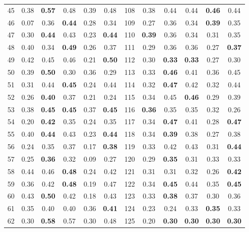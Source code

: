 \documentclass{article}
\begin{document}
{\begin{longtable}{cccccc@{\qquad}cccccc}
45 & 0.38 & \textbf{0.57} & 0.48 & 0.39 & 0.48 & 108 & 0.38 & 0.44 & 0.44 & \textbf{0.46} & 0.44 \\
46 & 0.07 & 0.36 & \textbf{0.44} & 0.28 & 0.34 & 109 & 0.27 & 0.36 & 0.34 & \textbf{0.39} & 0.35 \\
47 & 0.30 & \textbf{0.44} & 0.43 & 0.23 & \textbf{0.44} & 110 & \textbf{0.39} & 0.36 & 0.34 & 0.31 & 0.35 \\
48 & 0.40 & 0.34 & \textbf{0.49} & 0.26 & 0.37 & 111 & 0.29 & 0.36 & 0.36 & 0.27 & \textbf{0.37} \\
49 & 0.42 & 0.45 & 0.46 & 0.21 & \textbf{0.50} & 112 & 0.30 & \textbf{0.33} & \textbf{0.33} & 0.27 & 0.30 \\
50 & 0.39 & \textbf{0.50} & 0.30 & 0.36 & 0.29 & 113 & 0.33 & \textbf{0.46} & 0.41 & 0.36 & 0.45 \\
51 & 0.31 & 0.44 & \textbf{0.45} & 0.24 & 0.44 & 114 & 0.32 & \textbf{0.47} & 0.42 & 0.32 & 0.44 \\
52 & 0.26 & \textbf{0.40} & 0.37 & 0.21 & 0.24 & 115 & 0.34 & 0.45 & \textbf{0.46} & 0.29 & 0.39 \\
53 & 0.38 & \textbf{0.45} & \textbf{0.45} & 0.37 & \textbf{0.45} & 116 & \textbf{0.36} & 0.35 & 0.35 & 0.32 & 0.26 \\
54 & 0.20 & \textbf{0.42} & 0.35 & 0.24 & 0.35 & 117 & 0.34 & \textbf{0.47} & 0.41 & 0.28 & \textbf{0.47} \\
55 & 0.40 & \textbf{0.44} & 0.43 & 0.23 & \textbf{0.44} & 118 & 0.34 & \textbf{0.39} & 0.38 & 0.27 & 0.38 \\
56 & 0.24 & 0.35 & 0.37 & 0.17 & \textbf{0.38} & 119 & 0.33 & 0.42 & 0.43 & 0.31 & \textbf{0.44} \\
57 & 0.25 & \textbf{0.36} & 0.32 & 0.09 & 0.27 & 120 & 0.29 & \textbf{0.35} & 0.31 & 0.33 & 0.33 \\
58 & 0.44 & 0.46 & \textbf{0.48} & 0.24 & 0.42 & 121 & 0.31 & 0.31 & 0.32 & 0.26 & \textbf{0.42} \\
59 & 0.36 & 0.42 & \textbf{0.48} & 0.19 & 0.47 & 122 & 0.34 & \textbf{0.45} & 0.44 & 0.35 & \textbf{0.45} \\
60 & 0.43 & \textbf{0.50} & 0.42 & 0.18 & 0.43 & 123 & 0.33 & \textbf{0.38} & 0.37 & 0.30 & 0.36 \\
61 & 0.35 & 0.40 & 0.40 & 0.36 & \textbf{0.41} & 124 & 0.23 & 0.24 & 0.33 & \textbf{0.35} & 0.33 \\
62 & 0.30 & \textbf{0.58} & 0.57 & 0.30 & 0.48 & 125 & 0.20 & \textbf{0.30} & \textbf{0.30} & \textbf{0.30} & \textbf{0.30} \\

\end{longtable}}
\end{document}
